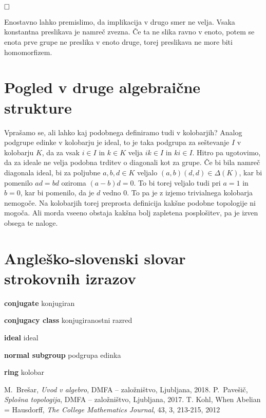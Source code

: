 \documentclass[a4paper,12pt]{article}
\newcommand{\geslo}[2]{\noindent\textbf{#1} {#2}}
\def\qed{$\hfill\Box$}   %
\begin{document}
\qed

Enostavno lahko premislimo, da implikacija v drugo smer ne velja. Vsaka konstantna preslikava je namreč zvezna. Če ta ne slika ravno v enoto, potem se enota prve grupe ne preslika v enoto druge,
torej preslikava ne more biti homomorfizem.

\section{Pogled v druge algebraične strukture}

Vprašamo se, ali lahko kaj podobnega definiramo tudi v kolobarjih? Analog podgrupe edinke v kolobarju je ideal, to je taka podgrupa za seštevanje $I$ v kolobarju $K$,
da za vsak $i \in I$ in $k \in K$ velja $ik \in I$ in $ki \in I$. Hitro pa ugotovimo, da za ideale ne velja podobna trditev o diagonali kot za grupe. Če bi bila namreč diagonala
ideal, bi za poljubne $a,b,d \in K$ veljalo $(a,b)(d,d) \in \Delta(K)$, kar bi pomenilo $ad = bd$ oziroma $(a-b)d = 0$. To bi torej veljalo tudi pri $a = 1$ in $b = 0$,
kar bi pomenilo, da je $d$ vedno $0$. To pa je z izjemo trivialnega kolobarja nemogoče.
Na kolobarjih torej preprosta definicija kakšne podobne topologije ni mogoča. Ali morda vseeno obstaja kakšna bolj zapletena posplošitev, pa je izven obsega te naloge.


\section*{Angleško-slovenski slovar strokovnih izrazov}

\geslo{conjugate}{konjugiran}

\geslo{conjugacy class}{konjugiranostni razred}

\geslo{ideal}{ideal}

\geslo{normal subgroup}{podgrupa edinka}

\geslo{ring}{kolobar}


\begin{thebibliography}{1}
    M.~Brešar, \emph{Uvod v algebro}, DMFA -- založništvo, Ljubljana, 2018.
    P.~Pavešič, \emph{Splošna topologija}, DMFA -- založništvo, Ljubljana, 2017.
    T. Kohl, When Abelian = Hausdorff, \emph{The College Mathematics Journal}, 43, 3, 213-215, 2012
\end{thebibliography}
    
\end{document}
